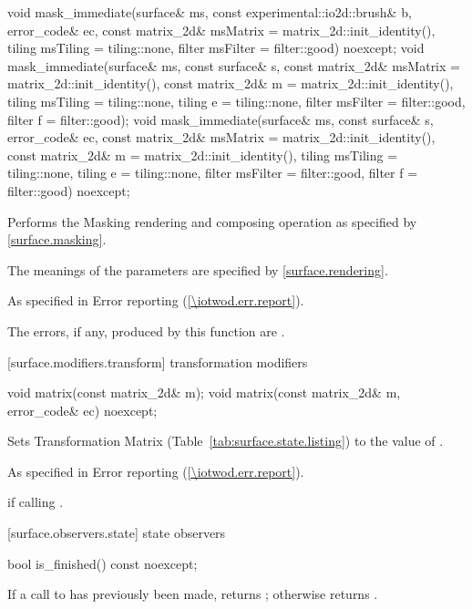 \begin{itemdecl}
void mask_immediate(surface& ms, const experimental::io2d::brush& b,
  error_code& ec, const matrix_2d& msMatrix = matrix_2d::init_identity(),
  tiling msTiling = tiling::none, filter msFilter = filter::good) noexcept;
void mask_immediate(surface& ms, const surface& s, 
  const matrix_2d& msMatrix = matrix_2d::init_identity(),
  const matrix_2d& m = matrix_2d::init_identity(),
  tiling msTiling = tiling::none, tiling e = tiling::none,
  filter msFilter = filter::good, filter f = filter::good);
void mask_immediate(surface& ms, const surface& s, error_code& ec,
  const matrix_2d& msMatrix = matrix_2d::init_identity(),
  const matrix_2d& m = matrix_2d::init_identity(),
  tiling msTiling = tiling::none, tiling e = tiling::none,
  filter msFilter = filter::good, filter f = filter::good) noexcept;
\end{itemdecl}
\begin{itemdescr}
\pnum
\effects
Performs the Masking rendering and composing operation as specified by \ref{surface.masking}.

\pnum
The meanings of the parameters are specified by \ref{surface.rendering}.

\pnum
\throws
As specified in Error reporting (\ref{\iotwod.err.report}).

\pnum
\errors
The errors, if any, produced by this function are .
\end{itemdescr}

 [surface.modifiers.transform] { transformation modifiers}

\begin{itemdecl}
void matrix(const matrix_2d& m);
void matrix(const matrix_2d& m, error_code& ec) noexcept;
\end{itemdecl}
\begin{itemdescr}
\pnum
\effects
Sets Transformation Matrix (Table~\ref{tab:surface.state.listing}) to the value of .

\pnum
\throws
As specified in Error reporting (\ref{\iotwod.err.report}).

\pnum
\errors
{} if calling .
\end{itemdescr}

 [surface.observers.state] { state observers}

\begin{itemdecl}
bool is_finished() const noexcept;
\end{itemdecl}
\begin{itemdescr}
\pnum
\returns
If a call to  has previously been made, returns ; otherwise returns .
\end{itemdescr}

